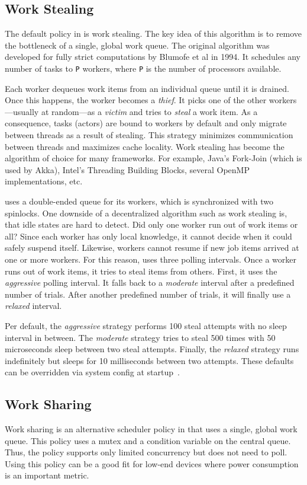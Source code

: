 \subsection{Work Stealing}
\label{work-stealing}

The default policy in \lib is work stealing. The key idea of this algorithm is to remove the bottleneck of a single, global work queue.  The original algorithm was developed for fully strict computations by Blumofe et al in 1994. It schedules any number of tasks to \lstinline^P^ workers, where \lstinline^P^ is the number of processors available.


Each worker dequeues work items from an individual queue until it is drained. Once this happens, the worker becomes a \emph{thief}. It picks one of the other workers---usually at random---as a \emph{victim} and tries to \emph{steal} a work item. As a consequence, tasks (actors) are bound to workers by default and only migrate between threads as a result of stealing. This strategy minimizes communication between threads and maximizes cache locality. Work stealing has become the algorithm of choice for many frameworks. For example, Java's Fork-Join (which is used by Akka), Intel's Threading Building Blocks, several OpenMP implementations, etc.

\lib uses a double-ended queue for its workers, which is synchronized with two spinlocks. One downside of a decentralized algorithm such as work stealing is, that idle states are hard to detect. Did only one worker run out of work items or all? Since each worker has only local knowledge, it cannot decide when it could safely suspend itself. Likewise, workers cannot resume if new job items arrived at one or more workers. For this reason, \lib uses three polling intervals. Once a worker runs out of work items, it tries to steal items from others. First, it uses the \emph{aggressive} polling interval. It falls back to a \emph{moderate} interval after a predefined number of trials. After another predefined number of trials, it will finally use a \emph{relaxed} interval.

Per default, the \emph{aggressive} strategy performs 100 steal attempts with no sleep interval in between. The \emph{moderate} strategy tries to steal 500 times with 50 microseconds sleep between two steal attempts. Finally, the \emph{relaxed} strategy runs indefinitely but sleeps for 10 milliseconds between two attempts. These defaults can be overridden via system config at startup~.

\subsection{Work Sharing}
\label{work-sharing}

Work sharing is an alternative scheduler policy in \lib that uses a single, global work queue. This policy uses a mutex and a condition variable on the central queue. Thus, the policy supports only limited concurrency but does not need to poll. Using this policy can be a good fit for low-end devices where power consumption is an important metric.

